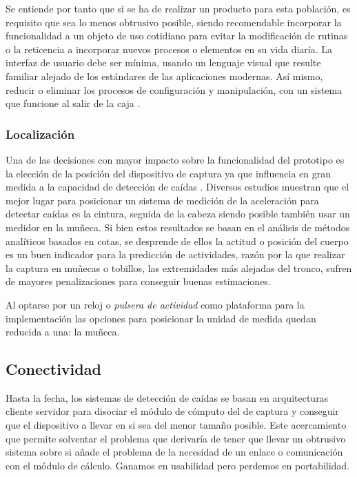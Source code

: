 \documentclass[../tfm.tex]{subfiles}
\begin{document}
Se entiende por tanto que si se ha de realizar un producto para esta población, es requisito que sea lo menos obtrusivo posible, siendo recomendable incorporar la funcionalidad a un objeto de uso cotidiano para evitar la modificación de rutinas o la reticencia a incorporar nuevos procesos o elementos en su vida diaría. La interfaz de usuario debe ser mínima, usando un lenguaje visual que resulte familiar alejado de los estándares de las aplicaciones modernas. Así mismo, reducir o eliminar los procesos de configuración y manipulación, con un sistema que funcione al salir de la caja .

\subsubsection{Localización}

Una de las decisiones con mayor impacto sobre la funcionalidad del prototipo es la elección de la posición del dispositivo de captura ya que influencia en gran medida a la capacidad de detección de caídas \cite{Kangas2008}. Diversos estudios muestran que el mejor lugar para posicionar un sistema de medición de la aceleración para detectar caídas es la cintura, seguida de la cabeza siendo posible también usar un medidor en la muñeca\cite{Chen2005, Kangas2008, Noury2007}. Si bien estos resultados se basan en el análisis de métodos analíticos basados en cotas, se desprende de ellos la actitud o posición del cuerpo es un buen indicador para la predicción de actividades, razón por la que realizar la captura en muñecas o tobillos, las extremidades más alejadas del tronco, sufren de mayores penalizaciones para conseguir buenas estimaciones.

Al optarse por un reloj o \textit{pulsera de actividad} como plataforma para la implementación las opciones para posicionar la unidad de medida quedan reducida a una: la muñeca.

\subsection{Conectividad}

Hasta la fecha, los sistemas de detección de caídas se basan en arquitecturas cliente servidor para disociar el módulo de cómputo del de captura y conseguir que el dispositivo a llevar en si sea del menor tamaño posible. Este acercamiento que permite solventar el problema que derivaría de tener que llevar un obtrusivo sistema sobre si añade el problema de la necesidad de un enlace o comunicación con el módulo de cálculo. Ganamos en usabilidad pero perdemos en portabilidad.
\end{document}
